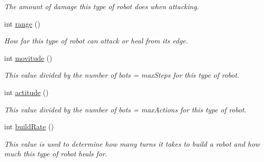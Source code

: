 \begin{DoxyCompactItemize}
\begin{DoxyCompactList}\small\item\em The amount of damage this type of robot does when attacking. \item\end{DoxyCompactList}\item 
\hypertarget{classType_a7db8748f0a0bed66ba31bd98358b5a06}{
int \hyperlink{classType_a7db8748f0a0bed66ba31bd98358b5a06}{range} ()}
\label{classType_a7db8748f0a0bed66ba31bd98358b5a06}

\begin{DoxyCompactList}\small\item\em How far this type of robot can attack or heal from its edge. \item\end{DoxyCompactList}\item 
\hypertarget{classType_a48f80d0fb8d6d697c0f434b0529c36d2}{
int \hyperlink{classType_a48f80d0fb8d6d697c0f434b0529c36d2}{movitude} ()}
\label{classType_a48f80d0fb8d6d697c0f434b0529c36d2}

\begin{DoxyCompactList}\small\item\em This value divided by the number of bots = maxSteps for this type of robot. \item\end{DoxyCompactList}\item 
\hypertarget{classType_ae140cb0996f8c2e4a5a75475d96f046a}{
int \hyperlink{classType_ae140cb0996f8c2e4a5a75475d96f046a}{actitude} ()}
\label{classType_ae140cb0996f8c2e4a5a75475d96f046a}

\begin{DoxyCompactList}\small\item\em This value divided by the number of bots = maxActions for this type of robot. \item\end{DoxyCompactList}\item 
\hypertarget{classType_a9cad009611919b14922d808c1f3638fa}{
int \hyperlink{classType_a9cad009611919b14922d808c1f3638fa}{buildRate} ()}
\label{classType_a9cad009611919b14922d808c1f3638fa}

\begin{DoxyCompactList}\small\item\em This value is used to determine how many turns it takes to build a robot and how much this type of robot heals for. \item\end{DoxyCompactList}\end{DoxyCompactItemize}
